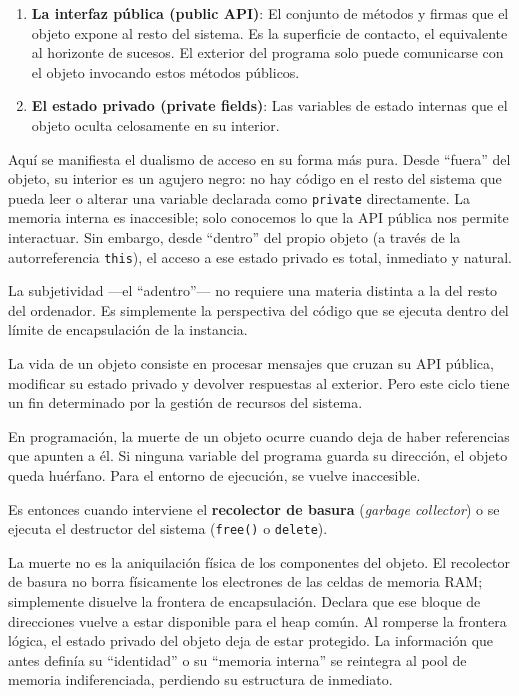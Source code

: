 \begin{enumerate}
\item \textbf{La interfaz pública (public API)}: El conjunto de métodos y firmas que el objeto expone al resto del sistema. Es la superficie de contacto, el equivalente al horizonte de sucesos. El exterior del programa solo puede comunicarse con el objeto invocando estos métodos públicos.
\item \textbf{El estado privado (private fields)}: Las variables de estado internas que el objeto oculta celosamente en su interior.
\end{enumerate}

Aquí se manifiesta el dualismo de acceso en su forma más pura. Desde “fuera” del objeto, su interior es un agujero negro: no hay código en el resto del sistema que pueda leer o alterar una variable declarada como \texttt{private} directamente. La memoria interna es inaccesible; solo conocemos lo que la API pública nos permite interactuar. Sin embargo, desde “dentro” del propio objeto (a través de la autorreferencia \texttt{this}), el acceso a ese estado privado es total, inmediato y natural.

La subjetividad —el “adentro”— no requiere una materia distinta a la del resto del ordenador. Es simplemente la perspectiva del código que se ejecuta dentro del límite de encapsulación de la instancia.


\noindent La vida de un objeto consiste en procesar mensajes que cruzan su API pública, modificar su estado privado y devolver respuestas al exterior. Pero este ciclo tiene un fin determinado por la gestión de recursos del sistema.

En programación, la muerte de un objeto ocurre cuando deja de haber referencias que apunten a él. Si ninguna variable del programa guarda su dirección, el objeto queda huérfano. Para el entorno de ejecución, se vuelve inaccesible.

Es entonces cuando interviene el \textbf{recolector de basura} (\emph{garbage collector}) o se ejecuta el destructor del sistema (\texttt{free()} o \texttt{delete}).

La muerte no es la aniquilación física de los componentes del objeto. El recolector de basura no borra físicamente los electrones de las celdas de memoria RAM; simplemente disuelve la frontera de encapsulación. Declara que ese bloque de direcciones vuelve a estar disponible para el heap común. Al romperse la frontera lógica, el estado privado del objeto deja de estar protegido. La información que antes definía su “identidad” o su “memoria interna” se reintegra al pool de memoria indiferenciada, perdiendo su estructura de inmediato.

